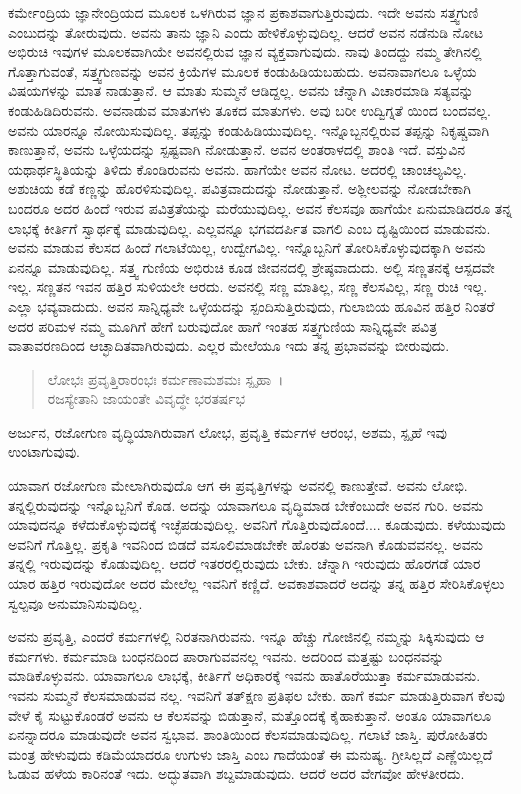 ಕರ್ಮೇಂದ್ರಿಯ ಜ್ಞಾನೇಂದ್ರಿಯದ ಮೂಲಕ ಒಳಗಿರುವ ಜ್ಞಾನ ಪ್ರಕಾಶವಾಗುತ್ತಿರುವುದು. ಇದೇ ಅವನು ಸತ್ತ್ವಗುಣಿ ಎಂಬುದನ್ನು ತೋರುವುದು. ಅವನು ತಾನು ಜ್ಞಾನಿ ಎಂದು ಹೇಳಿಕೊಳ್ಳುವುದಿಲ್ಲ. ಆದರೆ ಅವನ ನಡೆನುಡಿ ನೋಟ ಅಭಿರುಚಿ ಇವುಗಳ ಮೂಲಕವಾಗಿಯೇ ಅವನಲ್ಲಿರುವ ಜ್ಞಾನ ವ್ಯಕ್ತವಾಗುವುದು. ನಾವು ತಿಂದದ್ದು ನಮ್ಮ ತೇಗಿನಲ್ಲಿ ಗೊತ್ತಾಗುವಂತೆ, ಸತ್ತ್ವಗುಣವನ್ನು ಅವನ ಕ್ರಿಯೆಗಳ ಮೂಲಕ ಕಂಡುಹಿಡಿಯಬಹುದು. ಅವನಾವಾಗಲೂ ಒಳ್ಳೆಯ ವಿಷಯಗಳನ್ನು ಮಾತ ನಾಡುತ್ತಾನೆ. ಆ ಮಾತು ಸುಮ್ಮನೆ ಆಡಿದ್ದಲ್ಲ. ಅವನು ಚೆನ್ನಾಗಿ ವಿಚಾರಮಾಡಿ ಸತ್ಯವನ್ನು ಕಂಡುಹಿಡಿದಿರುವನು. ಅವನಾಡುವ ಮಾತುಗಳು ತೂಕದ ಮಾತುಗಳು. ಅವು ಬರೀ ಉದ್ವಿಗ್ನತೆ ಯಿಂದ ಬಂದವಲ್ಲ. ಅವನು ಯಾರನ್ನೂ ನೋಯಿಸುವುದಿಲ್ಲ. ತಪ್ಪನ್ನು ಕಂಡುಹಿಡಿಯುವುದಿಲ್ಲ. ಇನ್ನೊಬ್ಬನಲ್ಲಿರುವ ತಪ್ಪನ್ನು ನಿಕೃಷ್ಚವಾಗಿ ಕಾಣುತ್ತಾನೆ, ಅವನು ಒಳ್ಳೆಯದನ್ನು ಸ್ಪಷ್ಟವಾಗಿ ನೋಡುತ್ತಾನೆ. ಅವನ ಅಂತರಾಳದಲ್ಲಿ ಶಾಂತಿ ಇದೆ. ವಸ್ತುವಿನ ಯಥಾರ್ಥಸ್ಥಿತಿಯನ್ನು ತಿಳಿದು ಕೊಂಡಿರುವನು ಅವನು. ಹಾಗೆಯೇ ಅವನ ನೋಟ. ಅದರಲ್ಲಿ ಚಾಂಚಲ್ಯವಿಲ್ಲ. ಅಶುಚಿಯ ಕಡೆ ಕಣ್ಣನ್ನು ಹೊರಳಿಸುವುದಿಲ್ಲ. ಪವಿತ್ರವಾದುದನ್ನು ನೋಡುತ್ತಾನೆ. ಅಶ್ಲೀಲವನ್ನು ನೋಡಬೇಕಾಗಿ ಬಂದರೂ ಅದರ ಹಿಂದೆ ಇರುವ ಪವಿತ್ರತೆಯನ್ನು ಮರೆಯುವುದಿಲ್ಲ. ಅವನ ಕೆಲಸವೂ ಹಾಗೆಯೇ ಏನುಮಾಡಿದರೂ ತನ್ನ ಲಾಭಕ್ಕೆ ಕೀರ್ತಿಗೆ ಸ್ವಾರ್ಥಕ್ಕೆ ಮಾಡುವುದಿಲ್ಲ. ಎಲ್ಲವನ್ನೂ ಭಗವದರ್ಪಿತ ವಾಗಲಿ ಎಂಬ ದೃಷ್ಟಿಯಿಂದ ಮಾಡುವನು. ಅವನು ಮಾಡುವ ಕೆಲಸದ ಹಿಂದೆ ಗಲಾಟೆಯಿಲ್ಲ, ಉದ್ವೇಗವಿಲ್ಲ. ಇನ್ನೊಬ್ಬನಿಗೆ ತೋರಿಸಿಕೊಳ್ಳುವುದಕ್ಕಾಗಿ ಅವನು ಏನನ್ನೂ ಮಾಡುವುದಿಲ್ಲ. ಸತ್ತ್ವ ಗುಣಿಯ ಅಭಿರುಚಿ ಕೂಡ ಜೀವನದಲ್ಲಿ ಶ್ರೇಷ್ಠವಾದುದು. ಅಲ್ಲಿ ಸಣ್ಣತನಕ್ಕೆ ಆಸ್ಪದವೇ ಇಲ್ಲ. ಸಣ್ಣತನ ಇವನ ಹತ್ತಿರ ಸುಳಿಯಲೇ ಆರದು. ಅವನಲ್ಲಿ ಸಣ್ಣ ಮಾತಿಲ್ಲ, ಸಣ್ಣ ಕೆಲಸವಿಲ್ಲ, ಸಣ್ಣ ರುಚಿ ಇಲ್ಲ. ಎಲ್ಲಾ ಭವ್ಯವಾದುದು. ಅವನ ಸಾನ್ನಿಧ್ಯವೇ ಒಳ್ಳೆಯದನ್ನು ಸ್ಪಂದಿಸುತ್ತಿರುವುದು, ಗುಲಾಬಿಯ ಹೂವಿನ ಹತ್ತಿರ ನಿಂತರೆ ಅದರ ಪರಿಮಳ ನಮ್ಮ ಮೂಗಿಗೆ ಹೇಗೆ ಬರುವುದೋ ಹಾಗೆ ಇಂತಹ ಸತ್ತ್ವಗುಣಿಯ ಸಾನ್ನಿಧ್ಯವೇ ಪವಿತ್ರ ವಾತಾವರಣದಿಂದ ಆಚ್ಛಾದಿತವಾಗಿರುವುದು. ಎಲ್ಲರ ಮೇಲೆಯೂ ಇದು ತನ್ನ ಪ್ರಭಾವವನ್ನು ಬೀರುವುದು.

\begin{verse}
ಲೋಭಃ ಪ್ರವೃತ್ತಿರಾರಂಭಃ ಕರ್ಮಣಾಮಶಮಃ ಸ್ಪೃಹಾ~।\\ರಜಸ್ಯೇತಾನಿ ಜಾಯಂತೇ ವಿವೃದ್ಧೇ ಭರತರ್ಷಭ 
\end{verse}

{\small ಅರ್ಜುನ, ರಜೋಗುಣ ವೃದ್ಧಿಯಾಗಿರುವಾಗ ಲೋಭ, ಪ್ರವೃತ್ತಿ ಕರ್ಮಗಳ ಆರಂಭ, ಅಶಮ, ಸ್ಪೃಹೆ ಇವು ಉಂಟಾಗುವುವು.}

ಯಾವಾಗ ರಜೋಗುಣ ಮೇಲಾಗಿರುವುದೊ ಆಗ ಈ ಪ್ರವೃತ್ತಿಗಳನ್ನು ಅವನಲ್ಲಿ ಕಾಣುತ್ತೇವೆ. ಅವನು ಲೋಭಿ. ತನ್ನಲ್ಲಿರುವುದನ್ನು ಇನ್ನೊಬ್ಬನಿಗೆ ಕೊಡ. ಅದನ್ನು ಯಾವಾಗಲೂ ವೃದ್ಧಿಮಾಡ ಬೇಕೆಂಬುದೇ ಅವನ ಗುರಿ. ಅವನು ಯಾವುದನ್ನೂ ಕಳೆದುಕೊಳ್ಳುವುದಕ್ಕೆ ಇಚ್ಛೆಪಡುವುದಿಲ್ಲ. ಅವನಿಗೆ ಗೊತ್ತಿರುವುದೊಂದೆ.... ಕೂಡುವುದು. ಕಳೆಯುವುದು ಅವನಿಗೆ ಗೊತ್ತಿಲ್ಲ. ಪ್ರಕೃತಿ ಇವನಿಂದ ಬಿಡದೆ ವಸೂಲಿಮಾಡಬೇಕೇ ಹೊರತು ಅವನಾಗಿ ಕೊಡುವವನಲ್ಲ. ಅವನು ತನ್ನಲ್ಲಿ ಇರುವುದನ್ನು ಕೊಡುವುದಿಲ್ಲ. ಆದರೆ ಇತರರಲ್ಲಿರುವುದು ಬೇಕು. ಚೆನ್ನಾಗಿ ಇರುವುದು ಹೊರಗಡೆ ಯಾರ ಯಾರ ಹತ್ತಿರ ಇರುವುದೋ ಅದರ ಮೇಲೆಲ್ಲ ಇವನಿಗೆ ಕಣ್ಣಿದೆ. ಅವಕಾಶವಾದರೆ ಅದನ್ನು ತನ್ನ ಹತ್ತಿರ ಸೇರಿಸಿಕೊಳ್ಳಲು ಸ್ವಲ್ಪವೂ ಅನುಮಾನಿಸುವುದಿಲ್ಲ.

ಅವನು ಪ್ರವೃತ್ತಿ, ಎಂದರೆ ಕರ್ಮಗಳಲ್ಲಿ ನಿರತನಾಗಿರುವನು. ಇನ್ನೂ ಹೆಚ್ಚು ಗೋಜಿನಲ್ಲಿ ನಮ್ಮನ್ನು ಸಿಕ್ಕಿಸುವುದು ಆ ಕರ್ಮಗಳು. ಕರ್ಮಮಾಡಿ ಬಂಧನದಿಂದ ಪಾರಾಗುವವನಲ್ಲ ಇವನು. ಅದರಿಂದ ಮತ್ತಷ್ಟು ಬಂಧನವನ್ನು ಮಾಡಿಕೊಳ್ಳುವನು. ಯಾವಾಗಲೂ ಲಾಭಕ್ಕೆ, ಕೀರ್ತಿಗೆ ಅಧಿಕಾರಕ್ಕೆ ಇವನು ಹಾತೊರೆಯುತ್ತಾ ಕರ್ಮಮಾಡುವನು. ಇವನು ಸುಮ್ಮನೆ ಕೆಲಸಮಾಡುವವ ನಲ್ಲ. ಇವನಿಗೆ ತತ್​ಕ್ಷಣ ಪ್ರತಿಫಲ ಬೇಕು. ಹಾಗೆ ಕರ್ಮ ಮಾಡುತ್ತಿರುವಾಗ ಕೆಲವು ವೇಳೆ ಕೈ ಸುಟ್ಟುಕೊಂಡರೆ ಅವನು ಆ ಕೆಲಸವನ್ನು ಬಿಡುತ್ತಾನೆ, ಮತ್ತೊಂದಕ್ಕೆ ಕೈಹಾಕುತ್ತಾನೆ. ಅಂತೂ ಯಾವಾಗಲೂ ಏನನ್ನಾದರೂ ಮಾಡುವುದೇ ಅವನ ಸ್ವಭಾವ. ಶಾಂತಿಯಿಂದ ಕೆಲಸಮಾಡುವುದಿಲ್ಲ. ಗಲಾಟೆ ಜಾಸ್ತಿ. ಪುರೋಹಿತರು ಮಂತ್ರ ಹೇಳುವುದು ಕಡಿಮೆಯಾದರೂ ಉಗುಳು ಜಾಸ್ತಿ ಎಂಬ ಗಾದೆಯಂತೆ ಈ ಮನುಷ್ಯ. ಗ್ರೀಸಿಲ್ಲದೆ ಎಣ್ಣೆಯಿಲ್ಲದೆ ಓಡುವ ಹಳೆಯ ಕಾರಿನಂತೆ ಇದು. ಅದ್ಭುತವಾಗಿ ಶಬ್ದಮಾಡುವುದು. ಆದರೆ ಅದರ ವೇಗವೋ ಹೇಳತೀರದು.

